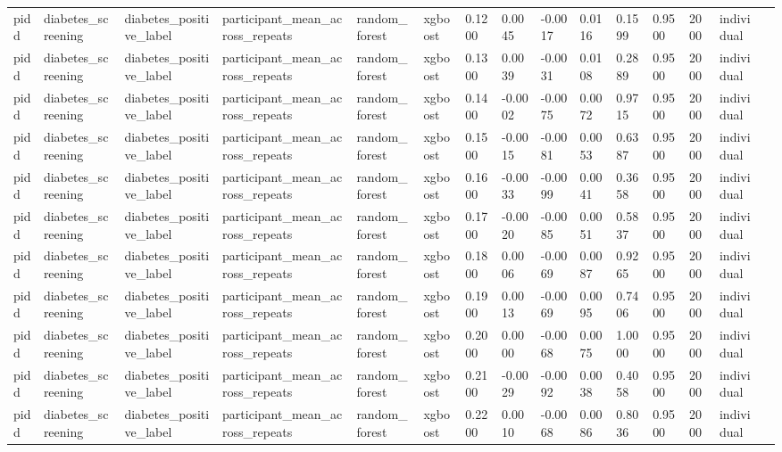 \begin{tabular}{lllllllllllllll}
pidd & diabetes\_screening & diabetes\_positive\_label & participant\_mean\_across\_repeats & random\_forest & xgboost & 0.1200 & 0.0045 & -0.0017 & 0.0116 & 0.1599 & 0.9500 & 2000 & individual &  \\
pidd & diabetes\_screening & diabetes\_positive\_label & participant\_mean\_across\_repeats & random\_forest & xgboost & 0.1300 & 0.0039 & -0.0031 & 0.0108 & 0.2889 & 0.9500 & 2000 & individual &  \\
pidd & diabetes\_screening & diabetes\_positive\_label & participant\_mean\_across\_repeats & random\_forest & xgboost & 0.1400 & -0.0002 & -0.0075 & 0.0072 & 0.9715 & 0.9500 & 2000 & individual &  \\
pidd & diabetes\_screening & diabetes\_positive\_label & participant\_mean\_across\_repeats & random\_forest & xgboost & 0.1500 & -0.0015 & -0.0081 & 0.0053 & 0.6387 & 0.9500 & 2000 & individual &  \\
pidd & diabetes\_screening & diabetes\_positive\_label & participant\_mean\_across\_repeats & random\_forest & xgboost & 0.1600 & -0.0033 & -0.0099 & 0.0041 & 0.3658 & 0.9500 & 2000 & individual &  \\
pidd & diabetes\_screening & diabetes\_positive\_label & participant\_mean\_across\_repeats & random\_forest & xgboost & 0.1700 & -0.0020 & -0.0085 & 0.0051 & 0.5837 & 0.9500 & 2000 & individual &  \\
pidd & diabetes\_screening & diabetes\_positive\_label & participant\_mean\_across\_repeats & random\_forest & xgboost & 0.1800 & 0.0006 & -0.0069 & 0.0087 & 0.9265 & 0.9500 & 2000 & individual &  \\
pidd & diabetes\_screening & diabetes\_positive\_label & participant\_mean\_across\_repeats & random\_forest & xgboost & 0.1900 & 0.0013 & -0.0069 & 0.0095 & 0.7406 & 0.9500 & 2000 & individual &  \\
pidd & diabetes\_screening & diabetes\_positive\_label & participant\_mean\_across\_repeats & random\_forest & xgboost & 0.2000 & 0.0000 & -0.0068 & 0.0075 & 1.0000 & 0.9500 & 2000 & individual &  \\
pidd & diabetes\_screening & diabetes\_positive\_label & participant\_mean\_across\_repeats & random\_forest & xgboost & 0.2100 & -0.0029 & -0.0092 & 0.0038 & 0.4058 & 0.9500 & 2000 & individual &  \\
pidd & diabetes\_screening & diabetes\_positive\_label & participant\_mean\_across\_repeats & random\_forest & xgboost & 0.2200 & 0.0010 & -0.0068 & 0.0086 & 0.8036 & 0.9500 & 2000 & individual &  \\

\end{tabular}
